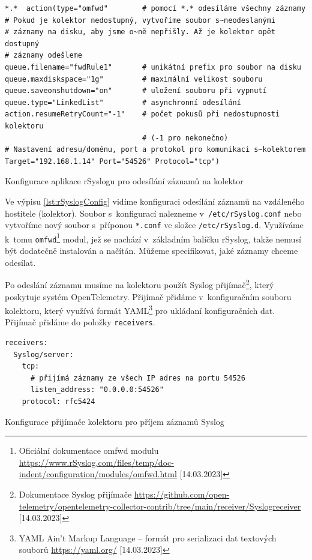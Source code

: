 \begin{listing}[H]
    \begin{verbatim}
*.*  action(type="omfwd"        # pomocí *.* odesíláme všechny záznamy
# Pokud je kolektor nedostupný, vytvoříme soubor s~neodeslanými 
# záznamy na disku, aby jsme o~ně nepřišly. Až je kolektor opět dostupný
# záznamy odešleme
queue.filename="fwdRule1"       # unikátní prefix pro soubor na disku
queue.maxdiskspace="1g"         # maximální velikost souboru
queue.saveonshutdown="on"       # uložení souboru při vypnutí
queue.type="LinkedList"         # asynchronní odesílání
action.resumeRetryCount="-1"    # počet pokusů při nedostupnosti kolektoru
                                # (-1 pro nekonečno)
# Nastavení adresu/doménu, port a protokol pro komunikaci s~kolektorem
Target="192.168.1.14" Port="54526" Protocol="tcp")
\end{verbatim}
    \caption{Konfigurace aplikace rSyslogu pro odesílání záznamů na kolektor}
    \label{lst:rSyslogConfig}
\end{listing}

Ve výpisu \ref{lst:rSyslogConfig} vidíme konfiguraci odesílání záznamů na vzdáleného hostitele (kolektor). Soubor s~konfigurací nalezneme v~\texttt{/etc/rSyslog.conf} nebo vytvoříme nový soubor s~příponou \texttt{*.conf} ve složce \texttt{/etc/rSyslog.d}. Využíváme k~tomu \texttt{omfwd}\footnote{Oficiální dokumentace omfwd modulu \url{https://www.rSyslog.com/files/temp/doc-indent/configuration/modules/omfwd.html} [14.03.2023]} modul, jež se nachází v~základním balíčku rSyslog, takže nemusí být dodatečně instalován a načítán. Můžeme specifikovat, jaké záznamy chceme odesílat.


Po odeslání záznamu musíme na kolektoru použít Syslog přijímač\footnote{Dokumentace Syslog přijímače \url{https://github.com/open-telemetry/opentelemetry-collector-contrib/tree/main/receiver/Syslogreceiver} [14.03.2023]}, který poskytuje systém OpenTelemetry. Přijímač přidáme v~konfiguračním souboru kolektoru, který využívá formát YAML\footnote{YAML Ain't Markup Language – formát pro serializaci dat textových souborů \url{https://yaml.org/} [14.03.2023]} pro ukládaní konfiguračních dat. Přijímač přidáme do položky \texttt{receivers}.


\begin{listing}[H]
    \begin{verbatim}
receivers:
  Syslog/server:
    tcp:
      # přijímá záznamy ze všech IP adres na portu 54526
      listen_address: "0.0.0.0:54526"
    protocol: rfc5424
\end{verbatim}
    \caption{Konfigurace přijímače kolektoru pro příjem záznamů Syslog}
    \label{lst:rSyslogReciever}
\end{listing}

